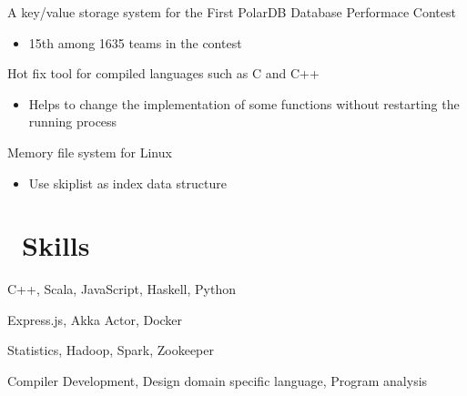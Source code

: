 \documentclass{resume}
\begin{document}
A key/value storage system for the First PolarDB Database Performace Contest
\begin{itemize}
	\item 15th among 1635 teams in the contest
\end{itemize}

Hot fix tool for compiled languages such as C and C++
\begin{itemize}
  \item Helps to change the implementation of some functions without restarting the running process
\end{itemize}


Memory file system for Linux
\begin{itemize}
	\item Use skiplist as index data structure
\end{itemize}

\section{\faCogs\ Skills}	
   C++, Scala, JavaScript, Haskell, Python

   Express.js, Akka Actor, Docker
   
	Statistics, Hadoop, Spark, Zookeeper
  
	Compiler Development, Design domain specific language, Program analysis
\end{document}
